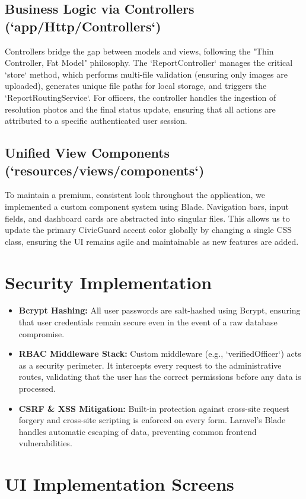 \subsection{Business Logic via Controllers (`app/Http/Controllers`)}
Controllers bridge the gap between models and views, following the "Thin Controller, Fat Model" philosophy. The `ReportController` manages the critical `store` method, which performs multi-file validation (ensuring only images are uploaded), generates unique file paths for local storage, and triggers the `ReportRoutingService`. For officers, the controller handles the ingestion of resolution photos and the final status update, ensuring that all actions are attributed to a specific authenticated user session.

\subsection{Unified View Components (`resources/views/components`)}
To maintain a premium, consistent look throughout the application, we implemented a custom component system using Blade. Navigation bars, input fields, and dashboard cards are abstracted into singular files. This allows us to update the primary CivicGuard accent color globally by changing a single CSS class, ensuring the UI remains agile and maintainable as new features are added.

\section{Security Implementation}
\begin{itemize}
    \item \textbf{Bcrypt Hashing:} All user passwords are salt-hashed using Bcrypt, ensuring that user credentials remain secure even in the event of a raw database compromise.
    \item \textbf{RBAC Middleware Stack:} Custom middleware (e.g., `verifiedOfficer`) acts as a security perimeter. It intercepts every request to the administrative routes, validating that the user has the correct permissions before any data is processed.
    \item \textbf{CSRF & XSS Mitigation:} Built-in protection against cross-site request forgery and cross-site scripting is enforced on every form. Laravel's Blade handles automatic escaping of data, preventing common frontend vulnerabilities.
\end{itemize}

\section{UI Implementation Screens}

